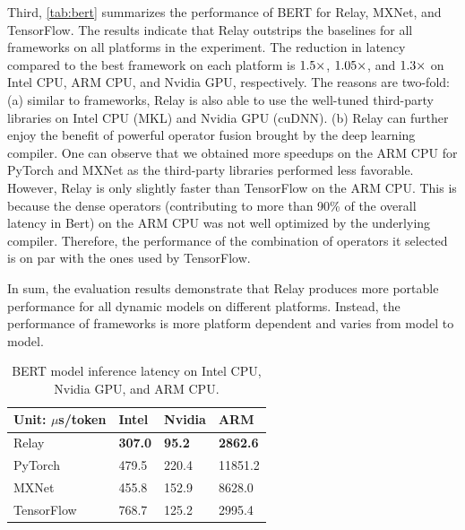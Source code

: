 Third, \autoref{tab:bert} summarizes the performance of BERT for Relay, MXNet, and TensorFlow. The results indicate that Relay outstrips the baselines for all frameworks on all platforms in the experiment. The reduction in latency compared to the best framework on each platform is $\fpeval{round(455.8/307, 1)}\times$, $\fpeval{round(2995.4/2862.6, 2)}\times$, and $\fpeval{round(125.2/95.2, 1)}\times$ on Intel CPU, ARM CPU, and Nvidia GPU, respectively.
The reasons are two-fold: (a) similar to frameworks, Relay is also able to use the well-tuned third-party libraries on Intel CPU (MKL) and Nvidia GPU (cuDNN). (b) Relay can further enjoy the benefit of powerful operator fusion brought by the deep learning compiler. One can observe that we obtained more speedups on the ARM CPU for PyTorch and MXNet as the third-party libraries performed less favorable. However, Relay is only slightly faster than TensorFlow on the ARM CPU. This is because the dense operators (contributing to more than 90\% of the overall latency in Bert) on the ARM CPU was not well optimized by the underlying compiler. Therefore, the performance of the combination of operators it selected is on par with the ones used by TensorFlow.

In sum, the evaluation results demonstrate that Relay produces more portable performance for all dynamic models on different platforms. Instead, the performance of frameworks is more platform dependent and varies from model to model.

\begin{table}[t]
\centering
\begin{tabular}{l|lll}
\toprule
Unit: $\mu$s/token    & Intel  &   Nvidia       &  ARM     \\ \midrule
Relay     & \bf{307.0} & \bf{95.2} & \bf{2862.6} \\
PyTorch & 479.5 & 220.4 & 11851.2 \\
MXNet      & 455.8 & 152.9 & 8628.0   \\
TensorFlow & 768.7 & 125.2 & 2995.4 \\
\bottomrule
\end{tabular}
\caption{BERT model inference latency on Intel CPU, Nvidia GPU, and ARM CPU.}
\label{tab:bert}
\end{table}

